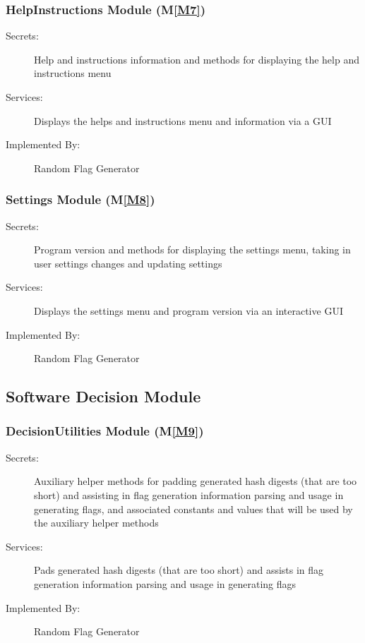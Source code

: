 \documentclass[12pt, titlepage]{article}
\newcommand{\mref}[1]{M\ref{#1}}
\begin{document}
\subsubsection{HelpInstructions Module (\mref{M7})}

\begin{description}
\item[Secrets:] Help and instructions information and methods for displaying
  the help and instructions menu
\item[Services:] Displays the helps and instructions menu and information via
  a GUI
\item[Implemented By:] Random Flag Generator
\end{description}

\subsubsection{Settings Module (\mref{M8})}

\begin{description}
\item[Secrets:] Program version and methods for displaying the settings menu,
  taking in user settings changes and updating settings
\item[Services:] Displays the settings menu and program version via an
  interactive GUI
\item[Implemented By:] Random Flag Generator
\end{description}

\subsection{Software Decision Module}

\subsubsection{DecisionUtilities Module (\mref{M9})}

\begin{description}
\item[Secrets:] Auxiliary helper methods for padding generated hash digests
  (that are too short) and assisting in flag generation information parsing
  and usage in generating flags, and associated constants and values that will
  be used by the auxiliary helper methods
\item[Services:] Pads generated hash digests (that are too short) and assists
  in flag generation information parsing and usage in generating flags
\item[Implemented By:] Random Flag Generator
\end{description}
\end{document}
